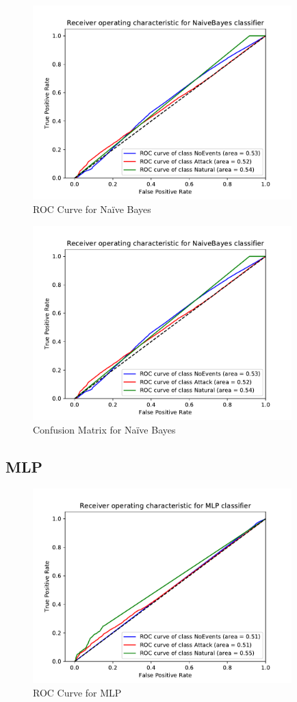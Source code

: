 \begin{figure}[H]
    \centering
    \includegraphics[page=1, width=100mm]{images/results_scikit/NaiveBayes}
    \caption{ROC Curve for Naïve Bayes}
    \label{fig_scikit_NB_ROC}
\end{figure}

\begin{figure}[H]
    \centering
    \includegraphics[page=2, width=100mm, trim= 0 50 0 100, clip]{images/results_scikit/NaiveBayes}
    \caption{Confusion Matrix for Naïve Bayes}
    \label{fig_scikit_NB_ROC}
\end{figure}

\subsection{MLP}

\begin{figure}[H]
    \centering
    \includegraphics[page=1, width=100mm]{images/results_scikit/MLP}
    \caption{ROC Curve for MLP}
    \label{fig_scikit_MLP_ROC}
\end{figure}

